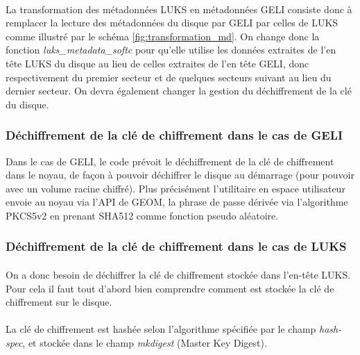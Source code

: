 \paragraph{}
La transformation des métadonnées LUKS en métadonnées GELI consiste donc à 
remplacer la lecture des métadonnées du disque par GELI par celles de LUKS 
comme illustré par le schéma \ref{fig:transformation_md}. On change donc la 
fonction {\em luks\_metadata\_softc} pour qu'elle utilise les données extraites
de l'en tête LUKS du disque au lieu de celles extraites de l'en tête GELI, donc
respectivement du premier secteur et de quelques secteurs suivant au lieu du 
dernier secteur. On devra également changer la gestion du déchiffrement de la 
clé du disque.


\subsubsection{Déchiffrement de la clé de chiffrement dans le cas de GELI}
Dans le cas de GELI, le code prévoit le déchiffrement de la clé de chiffrement 
dans le noyau, de façon à pouvoir déchiffrer le disque au démarrage (pour 
pouvoir avec un volume racine chiffré). Plus précisément l'utilitaire en espace
utilisateur envoie au noyau via l'API de GEOM, la phrase de passe dérivée via
l'algorithme PKCS5v2 en prenant SHA512 comme fonction pseudo aléatoire.


\subsubsection{Déchiffrement de la clé de chiffrement dans le cas de LUKS}
\label{sub:dechif_cle}
\paragraph{}
On a donc besoin de déchiffrer la clé de chiffrement stockée dans l'en-tête LUKS.
Pour cela il faut tout d'abord bien comprendre comment est stockée la clé de 
chiffrement sur le disque.

\paragraph{}
La clé de chiffrement est hashée selon l'algorithme spécifiée par le champ
{\em hash-spec}, et stockée dans le champ {\em mkdigest} (Master Key Digest).

